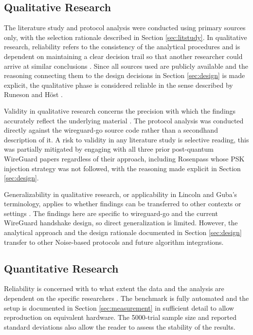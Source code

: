 \subsection{Qualitative Research} 
The literature study and protocol analysis were conducted using primary sources only, with the selection rationale described in Section \ref{sec:litstudy}. In qualitative research, reliability refers to the consistency of the analytical procedures and is dependent on maintaining a clear decision trail so that another researcher could arrive at similar conclusions \cite{noble2025}. Since all sources used are publicly available and the reasoning connecting them to the design decisions in Section \ref{sec:design} is made explicit, the qualitative phase is considered reliable in the sense described by Runeson and Höst \cite{runeson2009}.

Validity in qualitative research concerns the precision with which the findings accurately reflect the underlying material \cite{noble2025}. The protocol analysis was conducted directly against the wireguard-go source code rather than a secondhand description of it. A risk to validity in any literature study is selective reading, this was partially mitigated by engaging with all three prior post-quantum WireGuard papers regardless of their approach, including Rosenpass whose PSK injection strategy was not followed, with the reasoning made explicit in Section \ref{sec:design}.

Generalizability in qualitative research, or applicability in Lincoln and Guba's terminology, applies to whether findings can be transferred to other contexts or settings \cite{noble2025}. The findings here are specific to wireguard-go and the current WireGuard handshake design, so direct generalization is limited. However, the analytical approach and the design rationale documented in Section \ref{sec:design} transfer to other Noise-based protocols and future algorithm integrations.

\subsection{Quantitative Research} 
Reliability is concerned with to what extent the data and the analysis are dependent on the specific researchers \cite{runeson2009}. The benchmark is fully automated and the setup is documented in Section \ref{sec:measurement} in sufficient detail to allow reproduction on equivalent hardware. The 5000-trial sample size and reported standard deviations also allow the reader to assess the stability of the results.

